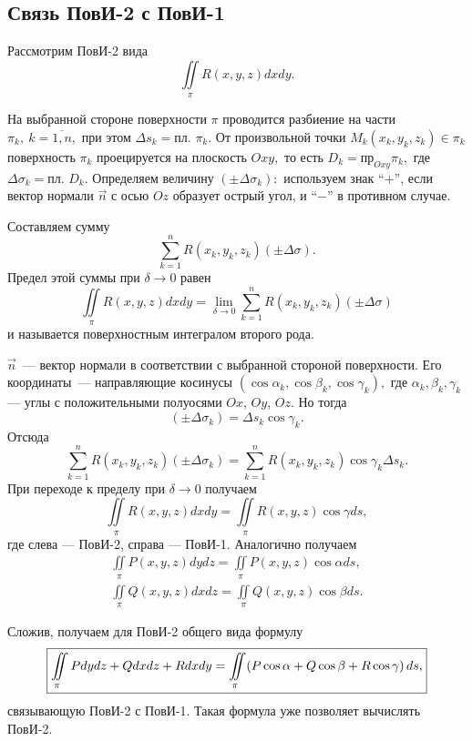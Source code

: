 \documentclass[../../main.tex]{subfiles}
\begin{document}
\subsection{Связь ПовИ-2 с ПовИ-1}

Рассмотрим ПовИ-2 вида \[\iint\limits_\pi R(x, y, z)dxdy.\]

На выбранной стороне поверхности $\pi$ проводится разбиение на части $\pi_k,\
 k=\overline{1,n},$ при этом $\Delta s_k =\text{пл. }\pi_k.$
От произвольной точки $M_k(x_k, y_k, z_k)\in\pi_k$ поверхность $\pi_k$ 
проецируется на плоскость $Oxy,$ то есть $D_k = \text{пр}_{Oxy} \pi_k,$ где
 $\Delta\sigma_k = \text{пл. }D_k.$
Определяем величину $(\pm\Delta\sigma_k):$ 
используем знак ``$+$'', если вектор нормали $\vec{n}$ с осью $Oz$ образует
 острый угол, и ``$-$'' в противном случае.

Составляем сумму \[\sum\limits_{k=1}^n R(x_k, y_k, z_k)(\pm\Delta\sigma).\] 
Предел этой суммы при
 $\delta\rightarrow 0$ равен
\[\iint\limits_\pi R(x, y, z)dxdy = \lim_{\delta\rightarrow 
0}\sum\limits_{k=1}^n
R(x_k, y_k, z_k)(\pm \Delta\sigma)\] и
называется поверхностным интегралом второго рода.

$\vec n$~--- вектор нормали в соответствии с выбранной стороной поверхности. 
Его координаты~--- направляющие косинусы $(\cos\alpha_k, \cos\beta_k, 
\cos\gamma_k),$ где $\alpha_k, 
\beta_k, \gamma_k$ --- углы с положительными полуосями $Ox$, $Oy$, $Oz$. Но 
тогда
\[(\pm\Delta\sigma_k) = \Delta s_k\cos\gamma_k.\]
Отсюда
\[\sum\limits_{k=1}^n R(x_k, y_k, z_k)(\pm \Delta\sigma_k) = 
\sum\limits_{k=1}^n 
 R(x_k, y_k, z_k) \cos\gamma_k \Delta s_k.\]
При переходе к пределу при $\delta\rightarrow 0$ получаем
\[\iint\limits_\pi R(x, y, z)dxdy = \iint\limits_\pi R(x, y, z) 
\cos\gamma ds,\] где слева --- ПовИ-2, справа --- ПовИ-1.
Аналогично получаем \begin{gather*}\iint\limits_\pi P(x, y, z)dydz = 
\iint\limits_\pi 
P(x, y, z) \cos\alpha ds, \\ \iint\limits_\pi Q(x, y, z)dxdz = \iint\limits_\pi
 Q(x, y, z) \cos\beta ds.\end{gather*}

Сложив, получаем для ПовИ-2 общего вида формулу
\begin{equation}\boxed{\label{lec24, num_1}\iint\limits_\pi Pdydz + Qdxdz + 
Rdxdy = 
\iint\limits_\pi(P\cos\alpha + Q\cos\beta + R\cos\gamma)\,ds,}\end{equation}
связывающую ПовИ-2 с ПовИ-1. Такая формула уже позволяет вычислять ПовИ-2.
\end{document}
